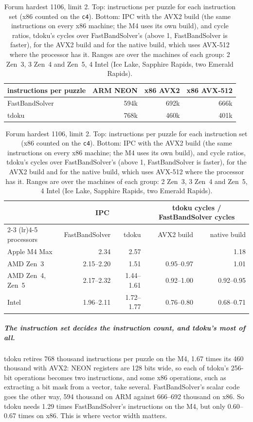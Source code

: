 \documentclass[a4paper,USenglish,cleveref,anonymous]{lipics-v2021}
\begin{document}
\begin{table}[t]
\centering
\caption{Forum hardest 1106, limit 2. Top: instructions per puzzle for each instruction set (x86 counted on the
\texttt{c4}). Bottom: IPC with the AVX2 build (the same instructions on every x86 machine; the M4 uses its own build),
and cycle ratios, tdoku's cycles over FastBandSolver's (above 1, FastBandSolver is faster), for the AVX2 build and for
the native build, which uses AVX-512 where the processor has it. Ranges are over the machines of each group: 2 Zen~3,
3 Zen~4 and Zen~5, 4 Intel (Ice Lake, Sapphire Rapids, two Emerald Rapids).}
\label{tab:cycles}
\small
\begin{tabular}{lrrr}
\toprule
instructions per puzzle & ARM NEON & x86 AVX2 & x86 AVX-512 \\
\midrule
FastBandSolver & 594k & 692k & 666k \\
tdoku & 768k & 460k & 401k \\
\bottomrule
\end{tabular}

\medskip
\begin{tabular}{lrrrr}
\toprule
& \multicolumn{2}{c}{IPC} & \multicolumn{2}{c}{tdoku cycles / FastBandSolver cycles} \\
\cmidrule(lr){2-3} \cmidrule(lr){4-5}
processors & FastBandSolver & tdoku & AVX2 build & native build \\
\midrule
Apple M4 Max & 2.34 & 2.57 & & 1.18 \\
AMD Zen~3 & 2.15--2.20 & 1.51 & 0.95--0.97 & 1.01 \\
AMD Zen~4, Zen~5 & 2.17--2.32 & 1.44--1.61 & 0.92--1.00 & 0.92--0.95 \\
Intel & 1.96--2.11 & 1.72--1.77 & 0.76--0.80 & 0.68--0.71 \\
\bottomrule
\end{tabular}
\end{table}

\subparagraph{The instruction set decides the instruction count, and tdoku's most of all.} tdoku retires 768 thousand
instructions per puzzle on the M4, 1.67 times its 460 thousand with AVX2: NEON registers are 128 bits wide, so each of
tdoku's 256-bit operations becomes two instructions, and some x86 operations, such as extracting a bit mask from a
vector, take several. FastBandSolver's scalar code goes the other way, 594 thousand on ARM against 666--692 thousand on
x86. So tdoku needs 1.29 times FastBandSolver's instructions on the M4, but only 0.60--0.67 times on x86. This is where
vector width matters.
\end{document}
